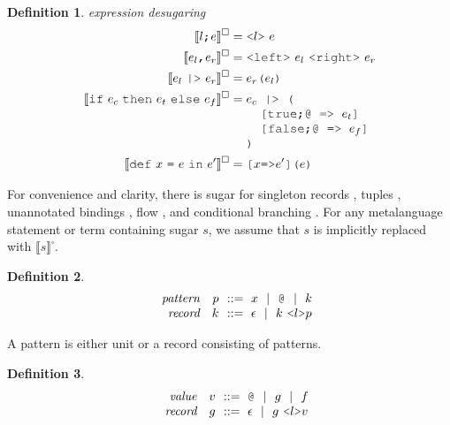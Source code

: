 \documentclass[table,dvipsnames,acmsmall]{acmart}
\theoremstyle{definition}
\newtheorem{definition}{Definition}[section]
\begin{document}
\begin{definition} 
  \label{def:expression_desugaring}
  \emph{expression desugaring}
  \hfill
  \small
  \nopad
  \begin{align*}
      \llbracket l \J{;} e \rrbracket^\square &= \J{<}l \J{>}\ e
      \\
      \llbracket e_l \J{,} e_r \rrbracket^\square &= \J{<left>}\ e_l \ \J{<right>}\ e_r
      \\
      \llbracket e_l\ \J{|>}\ e_r \rrbracket^\square &= e_r\J{(}e_l\J{)}
      \\
      \llbracket \J{if}\ e_c\ \J{then}\ e_t\ \J{else}\ e_f \rrbracket^\square &= 
      \begin{array}[t]{@{} l}
        e_c \J{ |> (}
          \\
          \I \J{[true;@ => } e_t \J{]}
          \\
          \I \J{[false;@ => } e_f \J{]}
          \\
        \J{)}
      \end{array}
      \\
      \llbracket \J{def}\ x\ \J{=}\ e\ \J{in}\ e' \rrbracket^\square &= \J{[}x \J{=>} e'\J{]}\J{(}e\J{)}
  \end{align*}

\end{definition} 

\noindent
For convenience and clarity, there is sugar for 
singleton records ,
tuples , 
unannotated bindings , flow ,
and conditional branching .
For any metalanguage statement or term containing sugar $s$, we assume that $s$ is implicitly replaced with $\llbracket s \rrbracket^\square$.

\begin{definition}
  \label{def:pattern}
  \small
  \nopad
  \[\begin{array}[t]{rr@{}l}
    \com{pattern} &
    \nonterm{p} & \is 
      x \sep
      \J{@} \sep
      k
    \\
    \com{record} &
    \nonterm{k} & \is \epsilon \sep k\ \J{<}l\J{>}p
  \end{array}\]
\end{definition}

\noindent
A pattern is either unit or a record consisting of patterns.

\begin{definition}
  \label{def:value}
  \small
  \nopad
  \[\begin{array}[t]{rr@{}l}
    \com{value} &
    \nonterm{v} & \is 
      \J{@} \sep
      g \sep
      f
    \\
    \com{record} &
    \nonterm{g} & \is \epsilon \sep g\ \J{<}l\J{>}v
  \end{array}\]
\end{definition}
\end{document}

